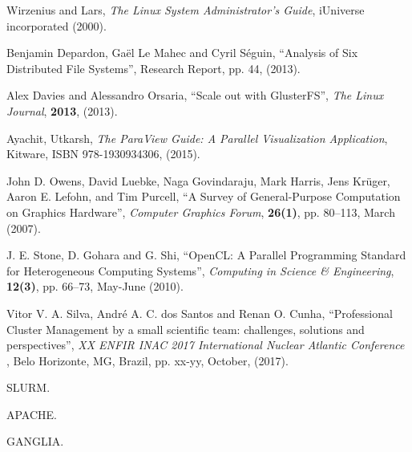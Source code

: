 \documentclass[twoside,a4paper,12pt,english]{inac19}
\begin{document}
\begin{thebibliography}{99}
 Wirzenius and Lars, \textit{The  Linux System Administrator's Guide}, iUniverse incorporated (2000).

 Benjamin Depardon, Ga\"{e}l Le Mahec and Cyril S\'{e}guin, ``Analysis of Six Distributed File Systems'', Research Report, pp. 44, (2013).
  
 Alex Davies and Alessandro Orsaria, ``Scale out with GlusterFS'', \textit{The Linux Journal}, \textbf{2013}, (2013).


 Ayachit, Utkarsh, \textit{The ParaView Guide: A Parallel Visualization Application}, Kitware, ISBN 978-1930934306, (2015).

  John D. Owens, David Luebke, Naga Govindaraju, Mark Harris, Jens Kr\"{u}ger, Aaron E. Lefohn, and Tim Purcell, ``A Survey of General-Purpose Computation on Graphics Hardware'', \textit{Computer Graphics Forum}, \textbf{26(1)}, pp. 80--113, March (2007).

 J. E. Stone, D. Gohara and G. Shi, ``OpenCL: A Parallel Programming Standard for Heterogeneous Computing Systems'', \textit{Computing in Science \& Engineering}, \textbf{12(3)}, pp. 66--73, May-June (2010).

 Vitor V. A. Silva, Andr\'{e} A. C. dos Santos and Renan O. Cunha, ``Professional Cluster Management
    by a small scientific team: challenges, solutions and perspectives'', \textit{XX ENFIR INAC 2017 International Nuclear Atlantic Conference }, Belo Horizonte, MG, Brazil, pp. xx-yy, October, (2017). 

   SLURM.
    
   APACHE.
    
   GANGLIA.
    
\end{thebibliography}

%
%
\end{document}
